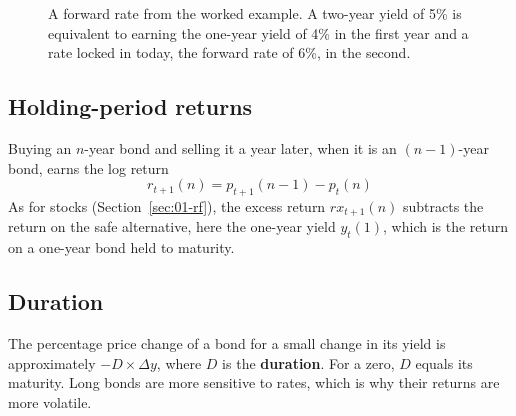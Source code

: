 \begin{figure}[htbp]
\centering
{}
\caption{A forward rate from the worked example. A two-year yield of 5\% is equivalent to earning the one-year yield of 4\% in the first year and a rate locked in today, the forward rate of 6\%, in the second.}
\label{fig:16-forward}
\end{figure}

\subsection{Holding-period returns}

Buying an $n$-year bond and selling it a year later, when it is an $(n-1)$-year bond, earns the log return
\begin{equation}
  r_{t+1}(n) = p_{t+1}(n-1) - p_t(n)
  \label{eq:16-hpr}
\end{equation}
As for stocks (Section~\ref{sec:01-rf}), the excess return $rx_{t+1}(n)$ subtracts the return on the safe alternative, here the one-year yield $y_t(1)$, which is the return on a one-year bond held to maturity.

\subsection{Duration}

The percentage price change of a bond for a small change in its yield is approximately $-D \times \Delta y$, where $D$ is the \textbf{duration}. For a zero, $D$ equals its maturity. Long bonds are more sensitive to rates, which is why their returns are more volatile.

